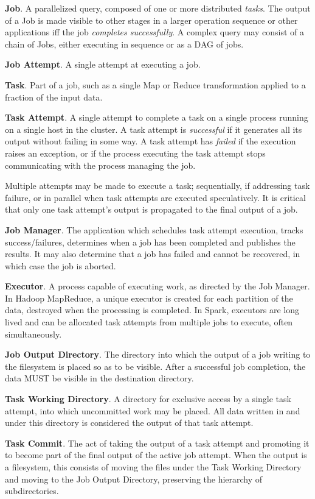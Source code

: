 \documentclass[conference]{IEEEtran}
\begin{document}
\textbf{Job}.
A parallelized query, composed of one or more distributed \emph{tasks}.
The output of a Job is made visible to other stages in a larger operation
sequence or other applications iff the job \emph{completes successfully}.
A complex query may consist of a chain of Jobs, either executing in sequence
or as a DAG of jobs.

\textbf{Job Attempt}.
A single attempt at executing a job.

\textbf{Task}.
Part of a job, such as a single Map or Reduce transformation applied to a fraction
of the input data.


\textbf{Task Attempt}.
A single attempt to complete a task on a single process running on a single host
in the cluster.
A task attempt is \emph{successful} if it generates all its output without
failing in some way.
A task attempt has \emph{failed} if the execution raises an exception, or
if the process executing the task attempt stops communicating with
the process managing the job.

Multiple attempts may be made to execute a task;
sequentially, if addressing task failure, or in parallel when task attempts are
executed speculatively.
It is critical that only one task attempt's output is propagated
to the final output of a job.


\textbf{Job Manager}.
The application which schedules task attempt execution, tracks success/failures,
determines when a job has been completed and publishes the results.
It may also determine that a job has failed and cannot be recovered,
in which case the job is aborted.

\textbf{Executor}.
A process capable of executing work, as directed by the Job Manager.
In Hadoop MapReduce, a unique executor is created for each partition
of the data, destroyed when the processing is completed.
In Spark, executors are long lived and can be allocated task attempts from multiple
jobs to execute, often simultaneously.

\textbf{Job Output Directory}.
The directory into which the output of a job writing to the filesystem is placed
so as to be visible.
After a successful job completion, the data MUST be visible in the destination
directory.

\textbf{Task Working Directory}.
A directory for exclusive access by a single task attempt, into which uncommitted
work may be placed.
All data written in and under this directory is considered the output of
that task attempt.


\textbf{Task Commit}.
The act of taking the output of a task attempt
and promoting it to become part of the final output of the active job
attempt.
When the output is a filesystem, this consists of moving the files
under the Task Working Directory and moving to the Job Output Directory,
preserving the hierarchy of subdirectories.
\end{document}
